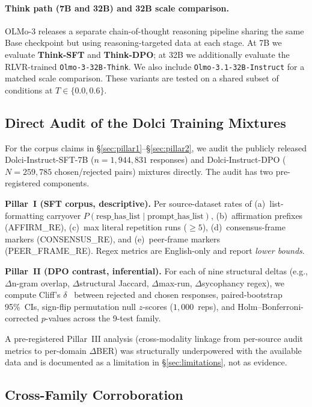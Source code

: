 \documentclass{article}
\begin{document}
\paragraph{Think path (7B and 32B) and 32B scale comparison.}
OLMo-3 releases a separate chain-of-thought reasoning pipeline sharing the same Base checkpoint but using reasoning-targeted data at each stage. At 7B we evaluate \textbf{Think-SFT} and \textbf{Think-DPO}; at 32B we additionally evaluate the RLVR-trained \texttt{Olmo-3-32B-Think}. We also include \texttt{Olmo-3.1-32B-Instruct} for a matched scale comparison. These variants are tested on a shared subset of conditions at $T \in \{0.0, 0.6\}$.

\subsection{Direct Audit of the Dolci Training Mixtures}
\label{sec:audit_method}

For the corpus claims in \S\ref{sec:pillar1}--\S\ref{sec:pillar2}, we audit the publicly released Dolci-Instruct-SFT-7B ($n{=}1{,}944{,}831$ responses) and Dolci-Instruct-DPO ($N{=}259{,}785$ chosen/rejected pairs) mixtures directly. The audit has two pre-registered components.

\textbf{Pillar~I (SFT corpus, descriptive).} Per source-dataset rates of (a)~list-formatting carryover $P(\text{resp\_has\_list}\mid\text{prompt\_has\_list})$, (b)~affirmation prefixes (\textsc{AFFIRM\_RE}), (c)~max literal repetition runs ($\geq 5$), (d)~consensus-frame markers (\textsc{CONSENSUS\_RE}), and (e)~peer-frame markers (\textsc{PEER\_FRAME\_RE}). Regex metrics are English-only and report \emph{lower bounds}.

\textbf{Pillar~II (DPO contrast, inferential).} For each of nine structural deltas (e.g., $\Delta$n-gram overlap, $\Delta$structural Jaccard, $\Delta$max-run, $\Delta$sycophancy regex), we compute Cliff's $\delta$~\citep{cliff1993dominance,romano2006} between rejected and chosen responses, paired-bootstrap 95\%~CIs, sign-flip permutation null $z$-scores ($1{,}000$~reps), and Holm--Bonferroni-corrected $p$-values across the 9-test family.

A pre-registered Pillar~III analysis (cross-modality linkage from per-source audit metrics to per-domain $\Delta$BER) was structurally underpowered with the available data and is documented as a limitation in \S\ref{sec:limitations}, not as evidence.

\subsection{Cross-Family Corroboration}
\label{sec:study2_method}
\end{document}
